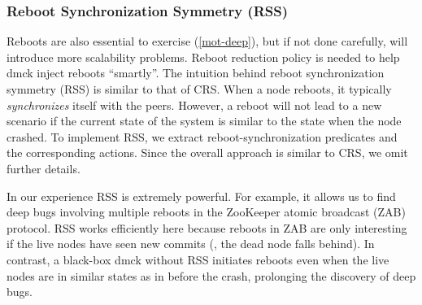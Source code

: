 



\subsubsection{Reboot Synchronization Symmetry (RSS)}
\label{sam-rss}


Reboots are also essential to exercise (\sec\ref{mot-deep}), but if not
done carefully, will introduce more scalability problems.  Reboot reduction
policy is needed to help dmck inject reboots ``smartly''.  The intuition
behind reboot synchronization symmetry (RSS) is similar to that of CRS.
When a node reboots, it typically {\em synchronizes} itself with the peers.
However, a reboot will not lead to a new scenario if the current state of
the system is similar to the state when the node crashed.  To implement
RSS, we extract reboot-synchronization predicates and the corresponding
actions.  Since the overall approach is similar to CRS, we omit further
details.


In our experience RSS is extremely powerful.  For example, it allows
us to find deep bugs involving multiple reboots in the ZooKeeper
atomic broadcast (ZAB) protocol.  RSS works efficiently here because
reboots in ZAB are only interesting if the live nodes have seen new
commits (\ie, the dead node falls behind).  In contrast, a black-box
dmck without RSS initiates reboots even when the live nodes are in
similar states as in before the crash, prolonging the discovery of
deep bugs.


